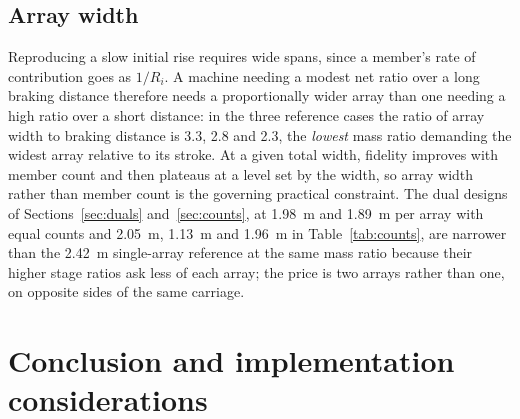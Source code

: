 \documentclass[preprint,12pt,number]{elsarticle}
\begin{document}
\subsection{Array width}
\label{sec:width}

Reproducing a slow initial rise requires wide spans, since a member's rate of contribution goes as $1/R_i$. A machine needing a modest net ratio over a long braking distance therefore needs a proportionally wider array than one needing a high ratio over a short distance: in the three reference cases the ratio of array width to braking distance is 3.3, 2.8 and 2.3, the \emph{lowest} mass ratio demanding the widest array relative to its stroke. At a given total width, fidelity improves with member count and then plateaus at a level set by the width, so array width rather than member count is the governing practical constraint. The dual designs of Sections~\ref{sec:duals} and~\ref{sec:counts}, at 1.98~m and 1.89~m per array with equal counts and 2.05~m, 1.13~m and 1.96~m in Table~\ref{tab:counts}, are narrower than the 2.42~m single-array reference at the same mass ratio because their higher stage ratios ask less of each array; the price is two arrays rather than one, on opposite sides of the same carriage.

\section{Conclusion and implementation considerations}
\label{sec:concl}
\end{document}
